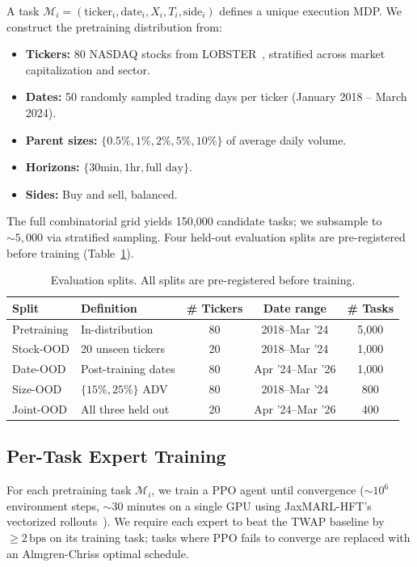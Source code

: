 \documentclass[sigconf,review,anonymous]{acmart}
\newcommand{\calM}{\mathcal{M}}
\newcommand{\bps}{\,\text{bps}}
\begin{document}
A task $\calM_i = (\text{ticker}_i, \text{date}_i, X_i, T_i, \text{side}_i)$ defines a unique execution MDP.
We construct the pretraining distribution from:
\begin{itemize}
    \item \textbf{Tickers:} 80 NASDAQ stocks from LOBSTER~\cite{huang2011lobster}, stratified across market capitalization and sector.
    \item \textbf{Dates:} 50 randomly sampled trading days per ticker (January 2018 -- March 2024).
    \item \textbf{Parent sizes:} $\{0.5\%, 1\%, 2\%, 5\%, 10\%\}$ of average daily volume.
    \item \textbf{Horizons:} $\{30\text{min}, 1\text{hr}, \text{full day}\}$.
    \item \textbf{Sides:} Buy and sell, balanced.
\end{itemize}

The full combinatorial grid yields 150{,}000 candidate tasks; we subsample to ${\sim}5{,}000$ via stratified sampling.
Four held-out evaluation splits are pre-registered before training (Table~\ref{tab:splits}).

\begin{table}[t]
\caption{Evaluation splits. All splits are pre-registered before training.}
\label{tab:splits}
\centering
\small
\begin{tabular}{@{}llccc@{}}
\toprule
\textbf{Split} & \textbf{Definition} & \textbf{\# Tickers} & \textbf{Date range} & \textbf{\# Tasks} \\
\midrule
Pretraining & In-distribution & 80 & 2018--Mar '24 & 5{,}000 \\
Stock-OOD   & 20 unseen tickers & 20 & 2018--Mar '24 & 1{,}000 \\
Date-OOD    & Post-training dates & 80 & Apr '24--Mar '26 & 1{,}000 \\
Size-OOD    & $\{15\%, 25\%\}$ ADV & 80 & 2018--Mar '24 & 800 \\
Joint-OOD   & All three held out & 20 & Apr '24--Mar '26 & 400 \\
\bottomrule
\end{tabular}
\end{table}

\subsection{Per-Task Expert Training}

For each pretraining task $\calM_i$, we train a PPO agent until convergence (${\sim}10^6$ environment steps, ${\sim}30$ minutes on a single GPU using JaxMARL-HFT's vectorized rollouts~\cite{mohl2025jaxmarl}).
We require each expert to beat the TWAP baseline by $\geq 2\bps$ on its training task; tasks where PPO fails to converge are replaced with an Almgren-Chriss optimal schedule.
\end{document}
